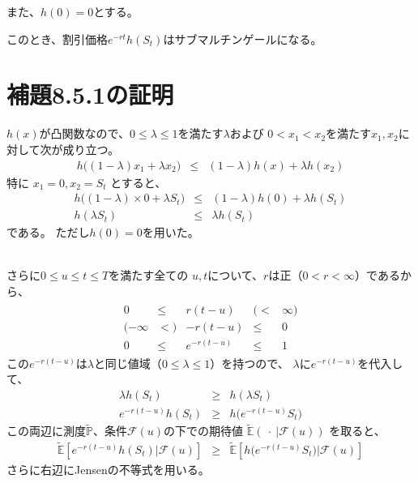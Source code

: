 \documentclass[uplatex,a4j,12pt,dvipdfmx]{jsarticle}
\begin{document}
また、$h(0)=0$とする。

このとき、割引価格$e^{-rt} h(S_{t})$はサブマルチンゲールになる。




\section{補題8.5.1\cite{Shreve2004}の証明}


$h(x)$が凸関数なので、$0 \leq \lambda \leq 1$を満たす$\lambda$および
$0<x_{1}<x_{2}$を満たす$x_{1},x_{2}$に対して次が成り立つ。
%
%
\begin{eqnarray*}
	h \Big( (1- \lambda) x_{1} + \lambda x_{2} \Big)
	&\leq&
	(1- \lambda) h(x) + \lambda h(x_{2})
\end{eqnarray*}
%
%
特に
$x_{1}=0,x_{2}=S_{t}$
とすると、
%
%
\begin{eqnarray*}
	h \Big( (1- \lambda) \times 0 + \lambda S_{t} \Big)
	&\leq&
	(1- \lambda) h(0) + \lambda h(S_{t})
	\\
	h ( \lambda S_{t} )
	&\leq&
	\lambda h(S_{t})
\end{eqnarray*}
%
%
である。
ただし$h(0)=0$を用いた。

\ \\

さらに$0 \leq u \leq t \leq T$を満たす全ての
$u,t$について、$r$は正（$0<r<\infty$）であるから、
%
%
\begin{eqnarray*}
	\begin{array}{ccccc}
		0
		 & \leq &
		r(t-u)
		 & ( <  &
		\infty )
		\\
		(
		- \infty
		 & < )  &
		-r(t-u)
		 & \leq &
		0
		\\
		0
		 & \leq &
		e^{-r(t-u)}
		 & \leq &
		1
	\end{array}
\end{eqnarray*}
%
%
この$e^{-r(t-u)}$は$\lambda$と同じ値域（$0 \leq \lambda \leq 1$）を持つので、
$\lambda$に$e^{-r(t-u)}$を代入して、
%
%
\begin{eqnarray*}
	\lambda h(S_{t}) &\geq& h ( \lambda S_{t} )
	\\
	e^{-r(t-u)} h(S_{t})
	&\geq&
	h \Big( e^{-r(t-u)} S_{t} \Big)
\end{eqnarray*}
%
%
この両辺に測度$\tilde{\mathbb{P}}$、条件$\mathcal{F}(u)$の下での期待値
$\tilde{\mathbb{E}}( \ \cdot \ | \mathcal{F}(u))$
を取ると、
%
%
\begin{eqnarray*}
	\tilde{\mathbb{E}} \left[
		e^{-r(t-u)} h(S_{t})
		\Big| \mathcal{F}(u)
		\right]
	&\geq&
	\tilde{\mathbb{E}} \left[
		h \Big( e^{-r(t-u)} S_{t} \Big)
		\Big|
		\mathcal{F}(u) \right]
\end{eqnarray*}
%
%
さらに右辺にJensenの不等式を用いる。
\end{document}
